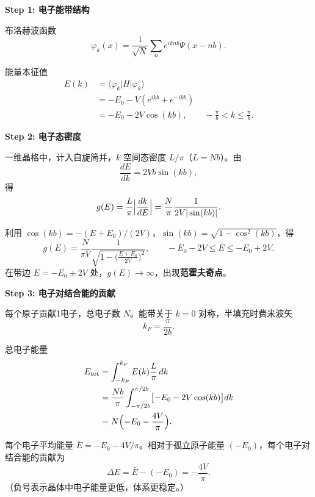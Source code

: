 \begin{derivationbox}[标准解题过程]
\textbf{Step 1: 电子能带结构}

布洛赫波函数
\begin{equation}
\varphi_k(x)=\frac{1}{\sqrt{N}}\sum_n e^{iknb}\Psi(x-nb).
\end{equation}

能量本征值
\begin{align}
E(k)&=\langle\varphi_k|H|\varphi_k\rangle \\
&=-E_0-V(e^{ikb}+e^{-ikb}) \\
&=\boxed{-E_0-2V\cos(kb),\qquad -\frac{\pi}{b}<k\le\frac{\pi}{b}.}
\end{align}

\textbf{Step 2: 电子态密度}

一维晶格中，计入自旋简并，$k$ 空间态密度 $L/\pi$（$L=Nb$）。由
\begin{equation}
\frac{dE}{dk}=2Vb\sin(kb),
\end{equation}
得
\begin{equation}
g(E)=\frac{L}{\pi}\Bigl|\frac{dk}{dE}\Bigr|=\frac{N}{\pi}\frac{1}{2V|\sin(kb)|}.
\end{equation}

利用 $\cos(kb)=-(E+E_0)/(2V)$，$\sin(kb)=\sqrt{1-\cos^2(kb)}$，得
\begin{equation}
\boxed{g(E)=\frac{N}{\pi V}\frac{1}{\sqrt{1-\bigl(\frac{E+E_0}{2V}\bigr)^2}},\qquad -E_0-2V\le E\le-E_0+2V.}
\end{equation}
在带边 $E=-E_0\pm2V$ 处，$g(E)\to\infty$，出现\textbf{范霍夫奇点}。

\textbf{Step 3: 电子对结合能的贡献}

每个原子贡献1电子，总电子数 $N$。能带关于 $k=0$ 对称，半填充时费米波矢
\begin{equation}
k_F=\frac{\pi}{2b}.
\end{equation}

总电子能量
\begin{align}
E_{\text{tot}}&=\int_{-k_F}^{k_F}E(k)\frac{L}{\pi}\,dk \\
&=\frac{Nb}{\pi}\int_{-\pi/2b}^{\pi/2b}\bigl[-E_0-2V\cos(kb)\bigr]dk \\
&=N\Bigl(-E_0-\frac{4V}{\pi}\Bigr).
\end{align}

每个电子平均能量 $\bar E=-E_0-4V/\pi$。相对于孤立原子能量 $(-E_0)$，每个电子对结合能的贡献为
\begin{equation}
\boxed{\Delta E=\bar E-(-E_0)=-\frac{4V}{\pi}.}
\end{equation}
（负号表示晶体中电子能量更低，体系更稳定。）


\end{derivationbox}
